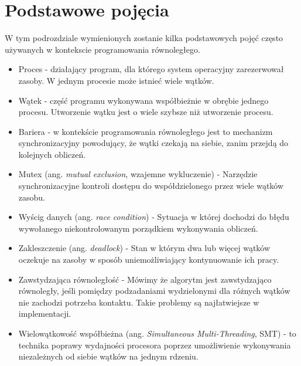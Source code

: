 \documentclass[a4paper,12pt]{book} %
\begin{document}
\section{Podstawowe pojęcia}
W tym podrozdziale wymienionych zostanie kilka podstawowych pojęć często używanych w kontekscie programowania równoległego.
\begin{itemize}
\item Proces - działający program, dla którego system operacyjny zarezerwował zasoby. W jednym procesie może istnieć wiele wątków.
\item Wątek - część programu wykonywana współbieżnie w obrębie jednego procesu. Utworzenie wątku jest o wiele szybsze niż utworzenie procesu.
\item Bariera - w kontekście programowania równoległego jest to mechanizm synchronizacyjny powodujący, że wątki czekają na siebie, zanim przejdą do kolejnych obliczeń.
\item Mutex (ang. \emph{mutual exclusion}, wzajemne wykluczenie) - Narzędzie synchronizacyjne kontroli dostępu do współdzielonego przez wiele wątków zasobu.
\item Wyścig danych (ang. \emph{race condition}) - Sytuacja w której dochodzi do błędu wywołanego niekontrolowanym porządkiem wykonywania obliczeń.
\item Zakleszczenie (ang. \emph{deadlock}) - Stan w którym dwa lub więcej wątków oczekuje na zasoby w sposób uniemożliwiający kontynuowanie ich pracy.
\item Zawstydzająca równoległość - Mówimy że algorytm jest zawstydzająco równoległy, jeśli pomiędzy podzadaniami wydzielonymi dla różnych wątków nie zachodzi potrzeba kontaktu. Takie problemy są najłatwiejsze w implementacji.
\item Wielowątkowość współbieżna (ang. \emph{Simultaneous Multi-Threading}, SMT) - to technika poprawy wydajności procesora poprzez umożliwienie wykonywania niezależnych od siebie wątków na jednym rdzeniu.
\end{itemize}
\end{document}
